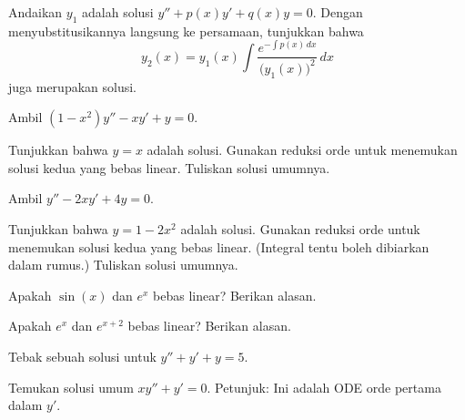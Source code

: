 \begin{exercise} \label{exercise:reductionoforder}
Andaikan $y_1$ adalah solusi $y'' + p(x) y' + q(x) y = 0$. Dengan menyubstitusikannya langsung ke persamaan, tunjukkan bahwa
\begin{equation*}
y_2(x) = y_1(x) \int \frac{e^{-\int p(x)\,dx}}{{\bigl(y_1(x)\bigr)}^2} \,dx
\end{equation*}
juga merupakan solusi.
\end{exercise}

\begin{exercise}
Ambil $(1-x^2)y''-xy' + y = 0$.
\begin{tasks}
\task Tunjukkan bahwa $y=x$ adalah solusi.
\task Gunakan reduksi orde untuk menemukan solusi kedua yang bebas linear.
\task Tuliskan solusi umumnya.
\end{tasks}
\end{exercise}

\begin{exercise}
Ambil $y''-2xy' + 4y = 0$.
\begin{tasks}
\task Tunjukkan bahwa $y=1-2x^2$ adalah solusi.
\task Gunakan reduksi orde untuk menemukan solusi kedua yang bebas linear.
(Integral tentu boleh dibiarkan dalam rumus.)
\task Tuliskan solusi umumnya.
\end{tasks}
\end{exercise}

\setcounter{exercise}{100}

\begin{exercise}
Apakah $\sin(x)$ dan $e^x$ bebas linear? Berikan alasan.
\end{exercise}

\begin{exercise}
Apakah $e^x$ dan $e^{x+2}$ bebas linear? Berikan alasan.
\end{exercise}

\begin{exercise}
Tebak sebuah solusi untuk $y'' + y' + y= 5$.
\end{exercise}

\begin{exercise}
Temukan solusi umum $x y'' + y' = 0$. Petunjuk: Ini adalah ODE orde pertama dalam $y'$.
\end{exercise}

